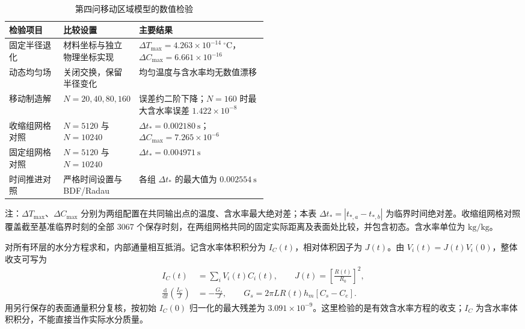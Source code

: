 \documentclass[UTF8,a4paper]{ctexart}
\begin{document}
\begin{table}[H]
\centering
\renewcommand{\arraystretch}{1.05}
\caption{第四问移动区域模型的数值检验}
\label{tab:q4-checks}
\small
\begin{tabularx}{\linewidth}{@{}>{\centering\arraybackslash}p{0.21\linewidth}>{\centering\arraybackslash}p{0.29\linewidth}>{\centering\arraybackslash}X@{}}
\toprule
\textbf{检验项目} & \textbf{比较设置} & \textbf{主要结果} \\
\midrule
固定半径退化 & 材料坐标与独立物理坐标实现 & \(\Delta T_{\max}=4.263\times10^{-14}~^\circ\mathrm C\)，\(\Delta C_{\max}=6.661\times10^{-16}\) \\
动态均匀场 & 关闭交换，保留半径变化 & 均匀温度与含水率均无数值漂移 \\
移动制造解 & \(N=20,40,80,160\) & 误差约二阶下降；\(N=160\) 时最大含水率误差 \(1.422\times10^{-8}\) \\
收缩组网格对照 & \(N=5120\) 与 \(N=10240\) & \(\Delta t_*=0.002180~\mathrm s\)；\(\Delta C_{\max}=7.265\times10^{-6}\) \\
固定组网格对照 & \(N=5120\) 与 \(N=10240\) & \(\Delta t_*=0.004971~\mathrm s\) \\
时间推进对照 & 严格时间设置与 BDF/Radau & 各组 \(\Delta t_*\) 的最大值为 \(0.002554~\mathrm s\) \\
\bottomrule
\end{tabularx}
\par\smallskip
\begin{minipage}{\linewidth}
\small 注：\(\Delta T_{\max}\)、\(\Delta C_{\max}\) 分别为两组配置在共同输出点的温度、含水率最大绝对差；本表 \(\Delta t_*=|t_{*,a}-t_{*,b}|\) 为临界时间绝对差。收缩组网格对照覆盖截至基准临界时刻的全部 \(3067\) 个保存时刻，在两组网格共同的固定实际距离及表面处比较，并包含初态。含水率单位为 \(\mathrm{kg/kg}\)。
\end{minipage}
\end{table}

对所有环层的水分方程求和，内部通量相互抵消。记含水率体积积分为 \(I_C(t)\)，相对体积因子为 \(J(t)\)。由 \(V_i(t)=J(t)V_i(0)\)，整体收支可写为
\begin{equation}
\begin{aligned}
I_C(t)&=\sum_iV_i(t)C_i(t),\qquad J(t)=\left[\frac{R(t)}{R_0}\right]^2,\\
\frac{\mathrm d}{\mathrm dt}\left(\frac{I_C}{J}\right)
&=-\frac{G_s}{J},\qquad
G_s=2\pi LR(t)h_m[C_s-C_e].
\end{aligned}
\label{eq:q4-moving-balance}
\end{equation}
用另行保存的表面通量积分复核，按初始 \(I_C(0)\) 归一化的最大残差为 \(3.091\times10^{-9}\)。这里检验的是有效含水率方程的收支；\(I_C\) 为含水率体积积分，不能直接当作实际水分质量。
\end{document}
